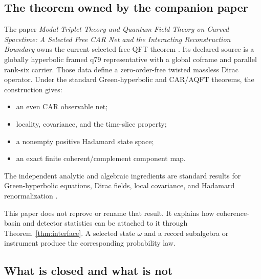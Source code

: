 \documentclass[11pt]{article}
\begin{document}
\subsection{The theorem owned by the companion paper}

The paper \emph{Modal Triplet Theory and Quantum Field Theory on Curved
Spacetime: A Selected Free CAR Net and the Interacting Reconstruction
Boundary} owns the current selected free-QFT theorem
\cite{nero_mtt_qft}.  Its declared source is a globally hyperbolic framed
q79 representative with a global coframe and parallel rank-six carrier.
Those data define a zero-order-free twisted massless Dirac operator.  Under
the standard Green-hyperbolic and CAR/AQFT theorems, the construction gives:
\begin{itemize}
\item an even CAR observable net;
\item locality, covariance, and the time-slice property;
\item a nonempty positive Hadamard state space;
\item an exact finite coherent/complement component map.
\end{itemize}
The independent analytic and algebraic ingredients are standard results for
Green-hyperbolic equations, Dirac fields, local covariance, and Hadamard
renormalization
\cite{bar_ginoux_pfaeffle,dimock,bfv,radzikowski,hollands_wald}.

This paper does not reprove or rename that result.  It explains how
coherence-basin and detector statistics can be attached to it through
Theorem~\ref{thm:interface}.  A selected state \(\omega\) and a record
subalgebra or instrument produce the corresponding probability law.

\subsection{What is closed and what is not}
\end{document}
